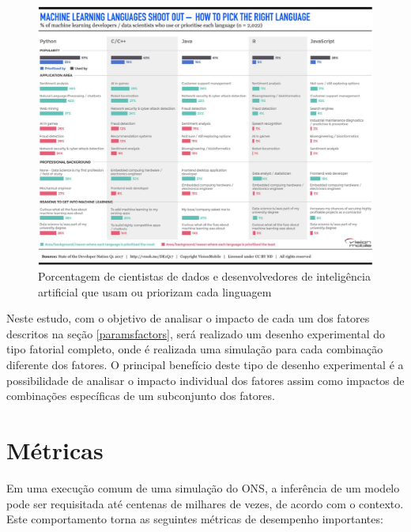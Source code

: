 \begin{figure}[h]
  \centering
  \includegraphics[width=1\textwidth]{img/languages-ml.png}
  \caption{Porcentagem de cientistas de dados e desenvolvedores de inteligência artificial que usam ou priorizam cada linguagem \cite{developer_nation_q1_2017}}
  \label{fig:languagesml}
\end{figure}

Neste estudo, com o objetivo de analisar o impacto de cada um dos fatores descritos na seção \ref{paramsfactors}, será realizado um desenho experimental do tipo fatorial completo, onde é realizada uma simulação para cada combinação diferente dos fatores. O principal benefício deste tipo de desenho experimental é a possibilidade de analisar o impacto individual dos fatores assim como impactos de combinações específicas de um subconjunto dos fatores.


\section{Métricas}

Em uma execução comum de uma simulação do ONS, a inferência de um modelo pode ser requisitada até centenas de milhares de vezes, de acordo com o contexto. Este comportamento torna as seguintes métricas de desempenho importantes:

